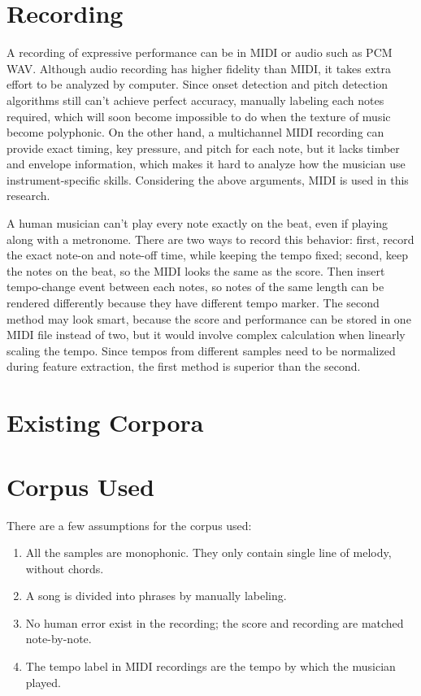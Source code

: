 

\section{Recording}
A recording of expressive performance can be in MIDI or audio such as PCM WAV. Although audio recording has higher fidelity than MIDI, it takes extra effort to be analyzed by computer. Since onset detection and pitch detection algorithms still can't achieve perfect accuracy, manually labeling each notes required, which will soon become impossible to do when the texture of music become polyphonic. On the other hand, a multichannel MIDI recording can provide exact timing, key pressure, and pitch for each note, but it lacks timber and envelope information, which makes it hard to analyze how the musician use instrument-specific skills. Considering the above arguments, MIDI is used in this research.

A human musician can't play every note exactly on the beat, even if playing along with a metronome. There are two ways to record this behavior: first, record the exact note-on and note-off time, while keeping the tempo fixed; second, keep the notes on the beat, so the MIDI looks the same as the score. Then insert tempo-change event between each notes, so notes of the same length can be rendered differently because they have different tempo marker. The second method may look smart, because the score and performance can be stored in one MIDI file instead of two, but it would involve complex calculation when linearly scaling the tempo. Since tempos from different samples need to be normalized during feature extraction, the first method is superior  than the second.



\section{Existing Corpora} 
\section{Corpus Used}

There are a few assumptions for the corpus used:
\begin{enumerate}
   \item All the samples are monophonic. They only contain single line of melody, without chords.
   \item A song is divided into phrases by manually labeling.
   \item No human error exist in the recording; the score and recording are matched note-by-note.
   \item The tempo label in MIDI recordings are the tempo by which the musician played. 
\end{enumerate}

